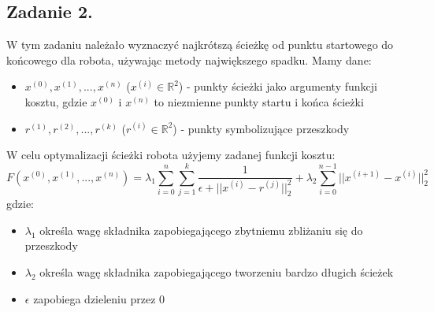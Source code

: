 \documentclass{article}
\begin{document}
\subsection{Zadanie 2.}
W tym zadaniu należało wyznaczyć najkrótszą ścieżkę od punktu startowego do końcowego dla robota, używając metody największego spadku. Mamy dane:
\begin{itemize}
\item $x^{(0)}, x^{(1)}, ..., x^{(n)}$ ($x^{(i)} \in \mathbb{R}^2$) - punkty ścieżki jako argumenty funkcji kosztu, gdzie $x^{(0)}$ i $x^{(n)}$ to niezmienne punkty startu i końca ścieżki
\item $r^{(1)}, r^{(2)}, ..., r^{(k)}$ ($r^{(i)} \in \mathbb{R}^2$) - punkty symbolizujące przeszkody
\end{itemize}
W celu optymalizacji ścieżki robota użyjemy zadanej funkcji kosztu:
$$F(x^{(0)},x^{(1)},...,x^{(n)}) = \lambda_1\sum_{i=0}^n\sum_{j=1}^k\frac{1}{\epsilon+||x^{(i)}-r^{(j)}||^2_2} + \lambda_2\sum_{i=0}^{n-1}||x^{(i+1)}-x^{(i)}||^2_2$$
gdzie:
\begin{itemize}
\item $\lambda_1$ określa wagę składnika zapobiegającego zbytniemu zbliżaniu się do przeszkody
\item $\lambda_2$ określa wagę składnika zapobiegającego tworzeniu bardzo długich ścieżek
\item $\epsilon$ zapobiega dzieleniu przez 0
\end{itemize}
\end{document}
